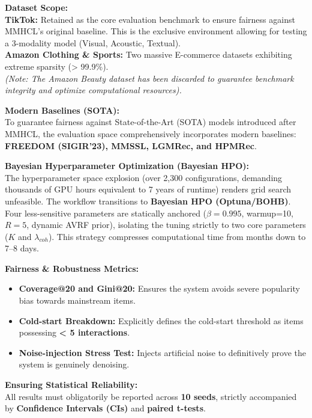 \documentclass[12pt, a4paper]{article}
\begin{document}
\textbf{Dataset Scope:}\\
\textbf{TikTok:} Retained as the core evaluation benchmark to ensure fairness against MMHCL's original baseline. This is the exclusive environment allowing for testing a 3-modality model (Visual, Acoustic, Textual).\\
\textbf{Amazon Clothing \& Sports:} Two massive E-commerce datasets exhibiting extreme sparsity (> 99.9\%).\\
\textit{(Note: The Amazon Beauty dataset has been discarded to guarantee benchmark integrity and optimize computational resources).}

\textbf{Modern Baselines (SOTA):}\\
To guarantee fairness against State-of-the-Art (SOTA) models introduced after MMHCL, the evaluation space comprehensively incorporates modern baselines: \textbf{FREEDOM (SIGIR'23), MMSSL, LGMRec, and HPMRec}.

\textbf{Bayesian Hyperparameter Optimization (Bayesian HPO):}\\
The hyperparameter space explosion (over 2,300 configurations, demanding thousands of GPU hours equivalent to 7 years of runtime) renders grid search unfeasible. The workflow transitions to \textbf{Bayesian HPO (Optuna/BOHB)}. Four less-sensitive parameters are statically anchored ($\beta=0.995$, warmup=10, $R=5$, dynamic AVRF prior), isolating the tuning strictly to two core parameters ($K$ and $\lambda_{coh}$). This strategy compresses computational time from months down to 7--8 days.

\textbf{Fairness \& Robustness Metrics:}\\
\begin{itemize}
    \item \textbf{Coverage@20 and Gini@20:} Ensures the system avoids severe popularity bias towards mainstream items.
    \item \textbf{Cold-start Breakdown:} Explicitly defines the cold-start threshold as items possessing \textbf{< 5 interactions}.
    \item \textbf{Noise-injection Stress Test:} Injects artificial noise to definitively prove the system is genuinely denoising.
\end{itemize}

\textbf{Ensuring Statistical Reliability:}\\
All results must obligatorily be reported across \textbf{10 seeds}, strictly accompanied by \textbf{Confidence Intervals (CIs)} and \textbf{paired t-tests}.
\end{document}
